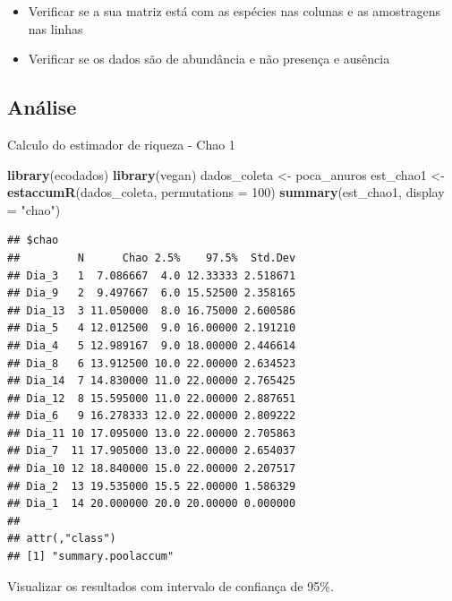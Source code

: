 \documentclass[
]{book}
\newenvironment{Shaded}{\begin{snugshade}}{\end{snugshade}}
\newcommand{\DataTypeTok}[1]{\textcolor[rgb]{0.13,0.29,0.53}{#1}}
\newcommand{\DecValTok}[1]{\textcolor[rgb]{0.00,0.00,0.81}{#1}}
\newcommand{\KeywordTok}[1]{\textcolor[rgb]{0.13,0.29,0.53}{\textbf{#1}}}
\newcommand{\NormalTok}[1]{#1}
\newcommand{\StringTok}[1]{\textcolor[rgb]{0.31,0.60,0.02}{#1}}
\providecommand{\tightlist}{%
  \setlength{\itemsep}{0pt}\setlength{\parskip}{0pt}}
\begin{document}
\begin{itemize}
\tightlist
\item
  Verificar se a sua matriz está com as espécies nas colunas e as amostragens nas linhas
\item
  Verificar se os dados são de abundância e não presença e ausência
\end{itemize}

\hypertarget{anuxe1lise}{%
\subsection{Análise}\label{anuxe1lise}}

Calculo do estimador de riqueza - Chao 1

\begin{Shaded}
\begin{Highlighting}[]
\KeywordTok{library}\NormalTok{(ecodados)}
\KeywordTok{library}\NormalTok{(vegan)}
\NormalTok{dados_coleta <-}\StringTok{ }\NormalTok{poca_anuros}
\NormalTok{est_chao1 <-}\StringTok{ }\KeywordTok{estaccumR}\NormalTok{(dados_coleta, }\DataTypeTok{permutations =} \DecValTok{100}\NormalTok{)}
\KeywordTok{summary}\NormalTok{(est_chao1, }\DataTypeTok{display =} \StringTok{"chao"}\NormalTok{)}
\end{Highlighting}
\end{Shaded}

\begin{verbatim}
## $chao
##         N      Chao 2.5%    97.5%  Std.Dev
## Dia_3   1  7.086667  4.0 12.33333 2.518671
## Dia_9   2  9.497667  6.0 15.52500 2.358165
## Dia_13  3 11.050000  8.0 16.75000 2.600586
## Dia_5   4 12.012500  9.0 16.00000 2.191210
## Dia_4   5 12.989167  9.0 18.00000 2.446614
## Dia_8   6 13.912500 10.0 22.00000 2.634523
## Dia_14  7 14.830000 11.0 22.00000 2.765425
## Dia_12  8 15.595000 11.0 22.00000 2.887651
## Dia_6   9 16.278333 12.0 22.00000 2.809222
## Dia_11 10 17.095000 13.0 22.00000 2.705863
## Dia_7  11 17.905000 13.0 22.00000 2.654037
## Dia_10 12 18.840000 15.0 22.00000 2.207517
## Dia_2  13 19.535000 15.5 22.00000 1.586329
## Dia_1  14 20.000000 20.0 20.00000 0.000000
## 
## attr(,"class")
## [1] "summary.poolaccum"
\end{verbatim}

Visualizar os resultados com intervalo de confiança de 95\%.
\end{document}
